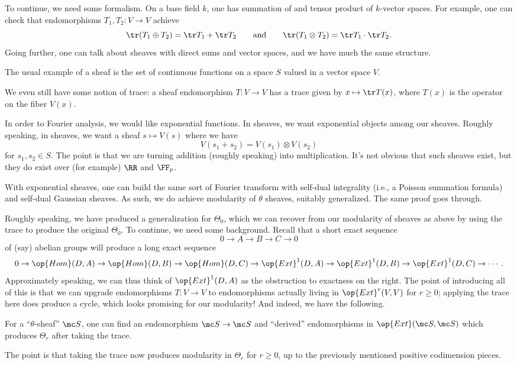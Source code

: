 \documentclass{article}
\begin{document}
To continue, we need some formalism. On a base field $k$, one has summation of and tensor product of $k$-vector spaces. For example, one can check that endomorphisms $T_1,T_2\colon V\to V$ achieve
\[\tr(T_1\oplus T_2)=\tr T_1+\tr T_2\qquad\text{and}\qquad\tr(T_1\otimes T_2)=\tr T_1\cdot\tr T_2.\]
Going further, one can talk about sheaves with direct sums and vector spaces, and we have much the same structure.
\begin{example}
	The usual example of a sheaf is the set of continuous functions on a space $S$ valued in a vector space $V$.
\end{example}
We even still have some notion of trace: a sheaf endomorphism $T\colon V\to V$ has a trace given by $x\mapsto\tr T(x)$, where $T(x)$ is the operator on the fiber $V(x)$.
\begin{example}
	In order to Fourier analysis, we would like exponential functions. In sheaves, we want exponential objects among our sheaves. Roughly speaking, in sheaves, we want a sheaf $s\mapsto V(s)$ where we have
	\[V(s_1+s_2)=V(s_1)\otimes V(s_2)\]
	for $s_1,s_2\in S$. The point is that we are turning addition (roughly speaking) into multiplication. It's not obvious that such sheaves exist, but they do exist over (for example) $\RR$ and $\FF_p$.
\end{example}
With exponential sheaves, one can build the same sort of Fourier transform with self-dual integrality (i.e., a Poisson summation formula) and self-dual Gaussian sheaves. As such, we do achieve modularity of $\theta$ sheaves, suitably generalized. The same proof goes through.

Roughly speaking, we have produced a generalization for $\Theta_0$, which we can recover from our modularity of sheaves as above by using the trace to produce the original $\Theta_0$. To continue, we need some background. Recall that a short exact sequence
\[0\to A\to B\to C\to0\]
of (say) abelian groups will produce a long exact sequence
\[0\to\op{Hom}(D,A)\to\op{Hom}(D,B)\to\op{Hom}(D,C)\to\op{Ext}^1(D,A)\to\op{Ext}^1(D,B)\to\op{Ext}^1(D,C)\to\cdots.\]
Approximately speaking, we can thus think of $\op{Ext}^1(D,A)$ as the obstruction to exactness on the right. The point of introducing all of this is that we can upgrade endomorphisms $T\colon V\to V$ to endomorphisms actually living in $\op{Ext}^r(V,V)$ for $r\ge0$; applying the trace here does produce a cycle, which looks promising for our modularity! And indeed, we have the following.
\begin{theorem}
	For a ``$\theta$-sheaf'' $\mc S$, one can find an endomorphism $\mc S\to\mc S$ and ``derived'' endomorphisms in $\op{Ext}(\mc S,\mc S)$ which produces $\Theta_r$ after taking the trace.
\end{theorem}
The point is that taking the trace now produces modularity in $\Theta_r$ for $r\ge0$, up to the previously mentioned positive codimension pieces.
\end{document}

